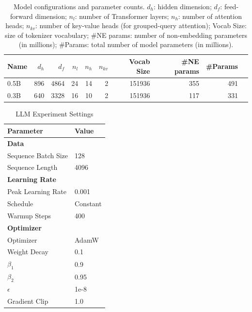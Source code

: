     
\begin{table}[htbp!]
\centering
\caption{Model configurations and parameter counts. $d_h$: hidden dimension; $d_f$: feed-forward dimension; $n_l$: number of Transformer layers; $n_h$: number of attention heads; $n_{kv}$: number of key-value heads (for grouped-query attention); Vocab Size: size of tokenizer vocabulary; \#NE params: number of non-embedding parameters (in millions); \#Params: total number of model parameters (in millions).}
\label{tab:model}
\begin{tabular}{lrrrrrrrrr}
\toprule
Name & $d_{h}$ & $d_f$ & $n_l$ & $n_h$ & $n_{kv}$ & Vocab Size & \#NE params & \#Params \\
\midrule
0.5B & 896 & 4864 & 24 & 14 & 2 & 151936 & 355 & 491 \\
0.3B & 640 & 3328 & 16 & 10 & 2 & 151936 & 117 & 331 \\
\bottomrule
\end{tabular}
\end{table}


\begin{table}[htbp!]
\centering
\caption{LLM Experiment Settings\label{tab:hyper}}
\begin{tabular}{ll}
\toprule
\textbf{Parameter} & \textbf{Value} \\
\midrule
\textbf{Data} & \\
\quad Sequence Batch Size & 128 \\
\quad Sequence Length & 4096 \\
\midrule
\textbf{Learning Rate} & \\
\quad Peak Learning Rate & 0.001 \\
\quad Schedule & Constant \\
\quad Warmup Steps & 400 \\
\midrule
\textbf{Optimizer} & \\
\quad Optimizer & AdamW \\
\quad Weight Decay & 0.1 \\
\quad $\beta_1$ & 0.9 \\
\quad $\beta_2$ & 0.95 \\
\quad $\epsilon$ & 1e-8 \\
\quad Gradient Clip & 1.0 \\
\bottomrule
\end{tabular}
\end{table}


